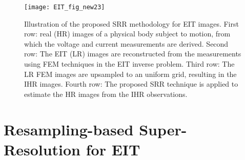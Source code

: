 \documentclass[10pt]{IEEEtran}
\newcommand{\cred}{}
\begin{document}
\begin{figure*}
    \centering %
    \texttt{[image: EIT\_fig\_new23]}
    \caption{Illustration of the proposed SRR methodology for EIT images.
    First row: real (HR) images of a physical body subject to motion, from which the voltage and current measurements are derived.
    Second row: The EIT (LR) images are reconstructed from the measurements using FEM techniques in the EIT inverse problem.
    Third row: The LR FEM images are upsampled to an uniform grid, resulting in the IHR images.
    Fourth row: The proposed SRR technique is applied to estimate the HR images from the IHR observations.}
    \label{fig:proposed_method_general}
\end{figure*}
















\section{Resampling-based Super-Resolution for EIT}
\label{sec:proposed_principle}
\end{document}
